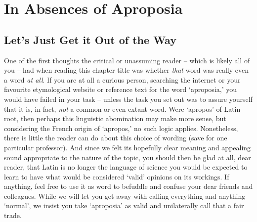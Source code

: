 %
%
%
\chapter{In Absences of Aproposia}
\label{chap:apropos} %



\section{Let's Just Get it Out of the Way}
\label{sec:aproposia-is-not-a-word}
\noindent One of the first thoughts the critical or unassuming reader -- which is likely all of you -- had when reading this chapter title was whether \emph{that} word was really even a word \emph{at all}. If you are at all a curious person, searching the internet or your favourite etymological website or reference text for the word `aproposia,' you would have failed in your task -- unless the task you set out was to assure yourself that it is, in fact, \emph{not} a common or even extant word. Were `apropos' of Latin root, then perhaps this linguistic abomination may make more sense, but considering the French origin of `apropos,' no such logic applies. Nonetheless, there is little the reader can do about this choice of wording (save for one particular professor). And since we felt its hopefully clear meaning and appealing sound appropriate to the nature of the topic, you should then be glad at all, dear reader, that Latin is no longer the language of science you would be expected to learn to have what would be considered `valid' opinions on its workings. If anything, feel free to use it as word to befuddle and confuse your dear friends and colleagues. While we will let you get away with calling everything and anything `normal', we insist you take `aproposia' as valid and unilaterally call that a fair trade.

